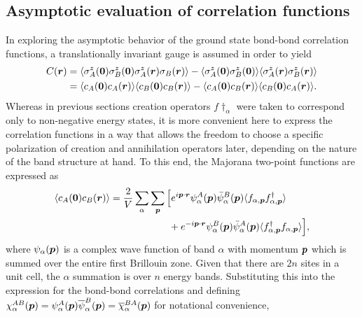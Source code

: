 %
%
\subsection{Asymptotic evaluation of correlation functions}
\label{section:chapter07_BondBondNumerics}
%
%
In exploring the asymptotic behavior of the ground state bond-bond correlation functions, a translationally invariant gauge is assumed in order to yield
%
\begin{align}
	C(\bm{r})	&= \langle \sigma_A^z(\bm{0}) \sigma_B^z(\bm{0}) \sigma_A^z(\bm{r}) \sigma_B(\bm{r}) \rangle - \langle \sigma_A^z(\bm{0}) \sigma_B^z(\bm{0}) \rangle \langle \sigma_A^z(\bm{r}) \sigma_B^z(\bm{r}) \rangle \nonumber\\
			&= \langle c_A(\bm{0}) c_A(\bm{r}) \rangle \langle c_B(\bm{0}) c_B(\bm{r}) \rangle - \langle c_A(\bm{0}) c_B(\bm{r}) \rangle \langle c_B(\bm{0}) c_A(\bm{r}) \rangle.
\end{align}
%
Whereas in previous sections creation operators $f\dag_{\alpha}$ were taken to correspond only to non-negative energy states, it is more convenient here to express the correlation functions in a way that allows the freedom to choose a specific polarization of creation and annihilation operators later, depending on the nature of the band structure at hand.
To this end, the Majorana two-point functions are expressed as
%
\begin{align}
	\langle c_A(\bm{0}) c_B(\bm{r}) \rangle &= \frac{2}{V} \sum_{\alpha} \sum_{\bm{p}} \Big[ e^{i \bm{p} \cdot \bm{r}} \psi_{\alpha}^A(\bm{p}) \bar{\psi}_{\alpha}^B(\bm{p}) \langle f_{\alpha, \bm{p}} f^{\dagger}_{\alpha, \bm{p}} \rangle \nonumber\\
							&\qquad\qquad\qquad+ e^{-i \bm{p} \cdot \bm{r}} \psi_{\alpha}^B(\bm{p}) \bar{\psi}_{\alpha}^A(\bm{p}) \langle f^{\dagger}_{\alpha, \bm{p}} f_{\alpha, \bm{p}} \rangle \Big],
\end{align}
%
where $\psi_{\alpha}(\bm{p})$ is a complex wave function of band $\alpha$ with momentum $\bm{p}$ which is summed over the entire first Brillouin zone.
Given that there are $2n$ sites in a unit cell, the $\alpha$ summation is over $n$ energy bands.
Substituting this into the expression for the bond-bond correlations and defining $\chi_{\alpha}^{AB}(\bm{p}) = \psi_{\alpha}^A(\bm{p}) \overline{\psi}_{\alpha}^B(\bm{p}) = \overline{\chi}_{\alpha}^{BA}(\bm{p})$ for notational convenience,
%
